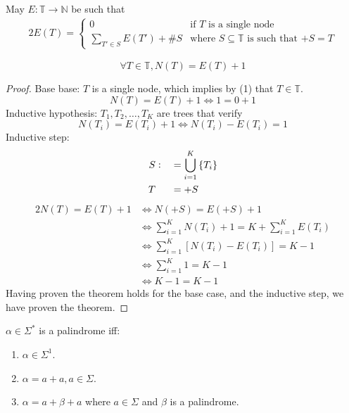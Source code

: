 \documentclass[docid=TP01]{tcom_TP}
\begin{document}
\begin{definition}
	May $E\colon\mathbb{T}\rightarrow\mathbb{N}$ be such that
	\begin{alignat*}{2}
		E(T)= \begin{cases}
			  0                            & \text{if $T$ is a single node}\\
			  \sum_{T' \in S}{E(T')} + \#S & \text{where $S\subseteq\mathbb{T}$ is such that $+S=T$} 
			  \end{cases}
	\end{alignat*}
\end{definition}
\begin{theorem}
\begin{equation*}
\forall T \in \mathbb{T}, N(T)=E(T)+1
\end{equation*}
\end{theorem}
\begin{proof}
Base base: $T$ is a single node, which implies by (1) that $T\in\mathbb{T}$.
\begin{equation*}
N(T)=E(T)+1 \iff 1=0+1
\end{equation*}
Inductive hypothesis: $T_1,T_2,\ldots,T_K$ are trees that verify
\begin{equation*}
N(T_i)=E(T_i)+1 \iff N(T_i)-E(T_i)=1
\end{equation*}
Inductive step:
\begin{alignat*}{2}
S&\vcentcolon&&=\bigcup_{i=1}^{K}{\{T_i\}}\\
T& &&=+S
\end{alignat*}
\begin{alignat*}{2}
N(T)=E(T)+1 &\iff N(+S)                          =E(+S)+1 \\
            &\iff \sum_{i=1}^{K}{N(T_i)}+1       =K+\sum_{i=1}^{K}{E(T_i)} \\
            &\iff \sum_{i=1}^{K}{[N(T_i)-E(T_i)]}=K-1 \\
            &\iff \sum_{i=1}^{K}{1}              =K-1 \\
            &\iff K-1                            =K-1
\end{alignat*}
Having proven the theorem holds for the base case, and the inductive step, we have proven the theorem.
\end{proof}
\pagebreak
{}
\begin{definition}[Palindrome]
\label{def:palindrome}
$\alpha\in\Sigma^*$ is a palindrome iff:
\begin{enumerate}
  \item \label{itm:pal:1} $\alpha\in\Sigma^1$.
  \item \label{itm:pal:2} $\alpha=a+a, a\in\Sigma$.
  \item \label{itm:pal:3} $\alpha=a+\beta+a$ where $a\in\Sigma$ and $\beta$ is a palindrome.
\end{enumerate}
\end{definition}
\end{document}
